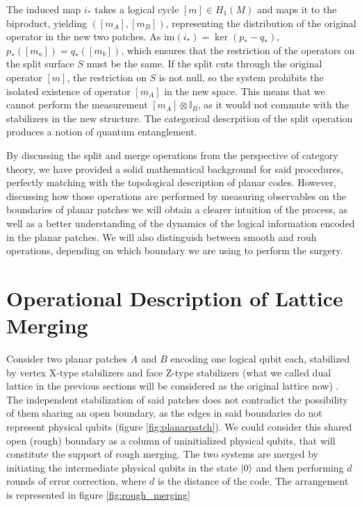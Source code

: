 \documentclass[12pt, twoside, openany]{book}
\begin{document}
The induced map $i_*$ takes a logical cycle $[m] \in H_1(M)$ and maps it to the biproduct, yielding $([m_A], [m_B])$, representing the distribution of the original operator in the new two patches. As $\text{im}(i_*) = \ker (p_* - q_*)$, $p_*([m_a]) = q_*([m_b])$, which ensures that the restriction of the operators on the split surface $S$ must be the same. If the split cuts through the original operator $[m]$, the restriction on $S$ is not null, so the system prohibits the isolated existence of operator $[m_A]$ in the new space. This means that we cannot perform the measurement $[m_A] \otimes \mathbb{I}_B$, as it would not commute with the stabilizers in the new structure. The categorical descrpition of the split operation produces a notion of quantum entanglement. 

By discussing the split and merge operations from the perspective of category theory, we have provided a solid mathematical background for said procedures, perfectly matching with the topological description of planar codes. However, discussing how those operations are performed by measuring observables on the boundaries of planar patches we will obtain a clearer intuition of the process, as well as a better understanding of the dynamics of the logical information encoded in the planar patches. We will also distinguish between smooth and rouh operations, depending on which boundary we are using to perform the surgery. \\

\section{Operational Description of Lattice Merging}

Consider two planar patches $A$ and $B$ encoding one logical qubit each, stabilized by vertex X-type stabilizers and face Z-type stabilizers (what we called dual lattice in the previous sections will be considered as the original lattice now) \Cite{Horsman2012}. The independent stabilization of said patches does not contradict the possibility of them sharing an open boundary, as the edges in said boundaries do not represent physical qubits (figure \ref{fig:planarpatch}). We could consider this shared open (rough) boundary as a column of uninitialized physical qubits, that will constitute the support of rough merging. The two systems are merged by initiating the intermediate physical qubits in the state $\ket{0}$ and then performing $d$ rounds of error correction, where $d$ is the distance of the code. The arrangement is represented in figure \ref{fig:rough_merging}
\end{document}
